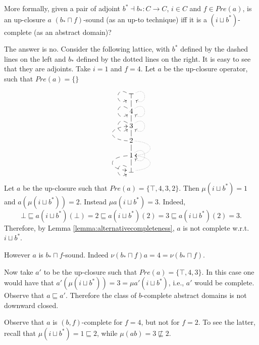\documentclass{llncs}
\begin{document}
More formally, given a pair of adjoint $b^*\dashv b_* \colon C\to C$, $i\in C$ and $f\in Pre(a)$, is an up-closure $a$ $(b_*\sqcap f)$-sound (as an up-to technique) iff it is a $(i \sqcup b^*)$-complete (as an abstract domain)?

The answer is no.  Consider the following lattice, with $b^*$ defined by the dashed lines on the left and $b_*$ defined by the dotted lines on the right. It is easy to see that they are adjoints. Take $i=1$ and $f=4$. Let $a$ be the up-closure operator, such that $Pre(a)= \{\}$

$$
\begin{array}{c}
{\lower-1.2cm\hbox{\xymatrix@R=0.3cm@C=0.3cm{  
\top \ar@{-->}@(ul,dl) \ar@{.>}@(ur,dr)  \\
4 \ar@{-->}@(ul,dl) \ar@{-}[u] \ar@{.>}@(ur,dr)   \\
3 \ar@{-->}@(ul,dl) \ar@{-}[u]  \ar@{.>}@(ur,dr)  \\
2\ar@{-}[u] \ar@{-->}@(l,l)[u] \ar@{.>}@(r,r)[d] \\
1\ar@{-}[u] \ar@{-->}@(l,l)[d] \ar@{.>}@(ur,dr)  \\
\bot \ar@{-->}@(ul,dl) \ar@{-}[u] \ar@{.>}@(r,r)[u]
}}}\end{array}
$$

Let $a$ be the up-closure  such that $Pre(a)= \{\top, 4,3,2\}$.
Then $\mu (i \sqcup b^*) = 1$ and $a(\mu (i \sqcup b^*) ) =2$.
Instead $\mu a (i \sqcup b^*)= 3$. Indeed,
$$\bot \sqsubseteq a (i \sqcup b^*)(\bot)= 2 \sqsubseteq a (i \sqcup b^*)(2)=3 \sqsubseteq a (i \sqcup b^*)(2)=3\text{.}$$
Therefore, by Lemma \ref{lemma:alternativecompleteness}, $a$ is not complete w.r.t. $i \sqcup b^*$.

However $a$ is $b_*\sqcap f$-sound. Indeed $\nu (b_*\sqcap f)a = 4 =  \nu (b_*\sqcap f)$.

\medskip

Now take $a'$ to be the up-closure  such that $Pre(a)= \{\top, 4,3\}$. In this case one would have that $a'(\mu (i \sqcup b^*) ) = 3 = \mu a' (i \sqcup b^*)$, i.e., $a'$ would be complete.
Observe that $a\sqsubseteq a'$. Therefore the class of $b$-complete abstract domains is not downward closed.

Observe that $a$ is $(b,f)$-complete for $f=4$, but not for $f=2$. To see the latter, recall that  $\mu (i \sqcup b^*) = 1\sqsubseteq 2$, while $\mu (ab)=3 \not \sqsubseteq 2$.
\end{document}
